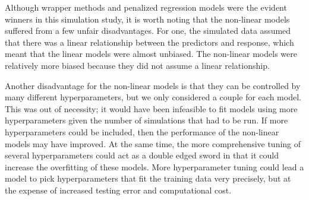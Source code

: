 \documentclass{article}
\begin{document}
	
	Although wrapper methods and penalized regression models were the evident winners in this simulation study, it is worth noting that the non-linear models suffered from a few unfair disadvantages. For one, the simulated data assumed that there was a linear relationship between the predictors and response, which meant that the linear models were almost unbiased. The non-linear models were relatively more biased because they did not assume a linear relationship. 
	
	Another disadvantage for the non-linear models is that they can be controlled by many different hyperparameters, but we only considered a couple for each model. This was out of necessity; it would have been infeasible to fit models using more hyperparameters given the number of simulations that had to be run. If more hyperparameters could be included, then the performance of the non-linear models may have improved. At the same time, the more comprehensive tuning of several hyperparameters could act as a double edged sword in that it could increase the overfitting of these models. More hyperparameter tuning could lead a model to pick hyperparameters that fit the training data very precisely, but at the expense of increased testing error and computational cost.
	
\end{document}
